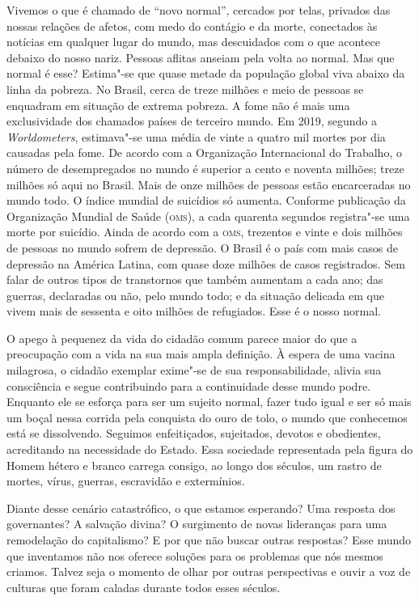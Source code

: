 Vivemos o que é chamado de ``novo normal'', cercados por telas, privados
das nossas relações de afetos, com medo do contágio e da morte,
conectados às notícias em qualquer lugar do mundo, mas descuidados com o
que acontece debaixo do nosso nariz. Pessoas aflitas anseiam pela volta
ao normal. Mas que normal é esse? Estima"-se que quase metade da
população global viva abaixo da linha da pobreza. No Brasil, cerca de
treze milhões e meio de pessoas se enquadram em situação de extrema
pobreza. A fome não é mais uma exclusividade dos chamados países de
terceiro mundo. Em 2019, segundo a \emph{Worldometers}, estimava"-se uma
média de vinte a quatro mil mortes por dia causadas pela fome. De acordo
com a Organização Internacional do Trabalho, o número de desempregados
no mundo é superior a cento e noventa milhões; treze milhões só aqui no
Brasil. Mais de onze milhões de pessoas estão encarceradas no mundo
todo. O índice mundial de suicídios só aumenta. Conforme publicação da
Organização Mundial de Saúde (\textsc{oms}), a cada quarenta segundos registra"-se
uma morte por suicídio. Ainda de acordo com a \textsc{oms}, trezentos e vinte e
dois milhões de pessoas no mundo sofrem de depressão. O Brasil é o país
com mais casos de depressão na América Latina, com quase doze milhões de
casos registrados. Sem falar de outros tipos de transtornos que também
aumentam a cada ano; das guerras, declaradas ou não, pelo mundo todo; e
da situação delicada em que vivem mais de sessenta e oito milhões de
refugiados. Esse é o nosso normal.

O apego à pequenez da vida do cidadão comum parece maior do que a
preocupação com a vida na sua mais ampla definição. À espera de uma
vacina milagrosa, o cidadão exemplar exime"-se de sua responsabilidade,
alivia sua consciência e segue contribuindo para a continuidade desse
mundo podre. Enquanto ele se esforça para ser um sujeito normal, fazer
tudo igual e ser só mais um boçal nessa corrida pela conquista do ouro
de tolo, o mundo que conhecemos está se dissolvendo. Seguimos
enfeitiçados, sujeitados, devotos e obedientes, acreditando na
necessidade do Estado. Essa sociedade representada pela figura do Homem
hétero e branco carrega consigo, ao longo dos séculos, um rastro de
mortes, vírus, guerras, escravidão e extermínios.

Diante desse cenário catastrófico, o que estamos esperando? Uma resposta
dos governantes? A salvação divina? O surgimento de novas lideranças
para uma remodelação do capitalismo? E por que não buscar outras
respostas? Esse mundo que inventamos não nos oferece soluções para os
problemas que nós mesmos criamos. Talvez seja o momento de olhar por
outras perspectivas e ouvir a voz de culturas que foram caladas durante
todos esses séculos.

